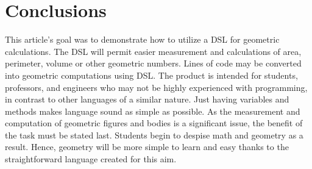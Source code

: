 \chapter*{Conclusions}

This article's goal was to demonstrate how to utilize a DSL for geometric calculations. The DSL will permit easier measurement and calculations of area, perimeter, volume or other geometric numbers. Lines of code may be converted into geometric computations using DSL. The product is intended for students, professors, and engineers who may not be highly experienced with programming, in contrast to other languages of a similar nature. Just having variables and methods makes language sound as simple as possible. As the measurement and computation of geometric figures and bodies is a significant issue, the benefit of the task must be stated last. Students begin to despise math and geometry as a result. Hence, geometry will be more simple to learn and easy thanks to the straightforward language created for this aim.

